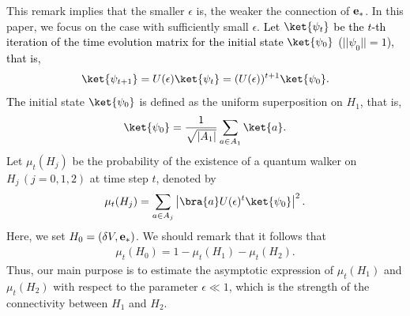 \documentclass[12pt]{article}
\newtheorem{definition}{Definition}
\numberwithin{lemma}{section}
\numberwithin{proposition}{section}
\numberwithin{remark}{section}
\numberwithin{definition}{section}
\newcommand{\red}{\textcolor{black}}
\begin{document}
This remark implies that the smaller $\epsilon$ is, the weaker the connection of $\bold{e}_{*}$.
In this paper, we focus on the case with sufficiently small $\epsilon$.
\red{Let $\ket{\psi_{t}}$ be the $t$-th iteration of the time evolution matrix for \red{the} initial state $\ket{\psi_{0}}$ \red{($||\psi_0||=1$)}, that is, 
\begin{align*}
    \ket{\psi_{t+1}}=U(\epsilon)\ket{\psi_{t}}=(U(\epsilon))^{t+1}\ket{\psi_{0}}.
\end{align*}
}
\red{The} initial state $\ket{\psi_0}$ is defined as the uniform superposition on $H_1$, that is,
\begin{align}
    \label{eq: initial state}
    \ket{\psi_0}=\frac{1}{\sqrt{|A_1|}}\sum_{a\in A_1}\ket{a}.
\end{align}
Let $\mu_{t}(H_j)$ be the probability of the existence of a quantum walker on $H_j\,(j=0,1,2)$ at time step $t$, denoted by
\begin{align}\label{eq:mut}
    \mu_{t}(H_j)=\sum_{a\in A_j}\left|\bra{a}U(\epsilon)^t\ket{\psi_0}\right|^2.
\end{align}
Here, we set $H_0=(\delta V, \bold{e}_*)$.
We should remark that it follows that
\begin{align*}
    \mu_{t}(H_0)=1-\mu_{t}(H_1)-\mu_{t}(H_2).
\end{align*}
 Thus, our main purpose is to estimate the asymptotic expression of $\mu_{t}(H_1)$ and $\mu_t(H_2)$ with respect to the parameter $\epsilon \ll1$, which is the strength of the connectivity between $H_{1}$ and $H_{2}$.
\end{document}
